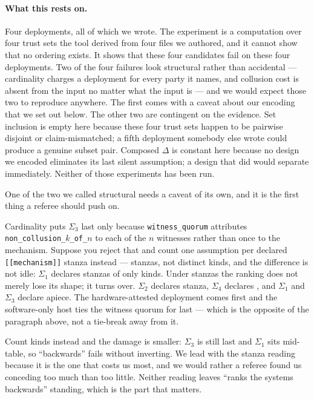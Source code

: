 \documentclass[11pt]{article}
\newcommand{\ub}{\_\allowbreak}
\begin{document}
\paragraph{What this rests on.} Four deployments, all of which we wrote.
The experiment is a computation over four trust sets the tool derived from
four files we authored, and it cannot show that no ordering exists. It shows
that these four candidates fail on these four deployments. Two of the four
failures look structural rather than accidental --- cardinality charges a
deployment for every party it names, and collusion cost is absent from the
input no matter what the input is --- and
we would expect those two to reproduce anywhere. The first comes with a
caveat about our encoding that we set out below. The other two are contingent
on the evidence. Set inclusion is empty here because these four trust sets
happen to be pairwise disjoint or claim-mismatched; a fifth deployment
somebody else wrote could produce a genuine subset pair. Composed $\Delta$ is
constant here because no design we encoded eliminates its last silent
assumption; a design that did would separate immediately. Neither of those
experiments has been run.

One of the two we called structural needs a caveat of its own, and it is the
first thing a referee should push on.

Cardinality puts $\Sigma_3$ last only because \texttt{witness\ub quorum}
attributes \texttt{non\ub collusion\ub $k$\ub of\ub $n$} to each of the $n$
witnesses rather than once to the mechanism. Suppose you reject that and
count one assumption per declared \texttt{[[mechanism]]} stanza instead ---
stanzas, not distinct kinds, and the difference is not idle: $\Sigma_1$
declares \SigmaOneMechanisms{} stanzas of only \SigmaOneMechanismKinds{}
kinds. Under stanzas the ranking does not merely lose its shape; it turns
over. $\Sigma_2$ declares \SigmaTwoMechanisms{} stanza, $\Sigma_4$ declares
\SigmaFourMechanisms{}, and $\Sigma_1$ and $\Sigma_3$ declare
\SigmaOneMechanisms{} apiece. The hardware-attested deployment comes first
and the software-only host ties the witness quorum for last --- which is the
opposite of the paragraph above, not a tie-break away from it.

Count kinds instead and the damage is smaller: $\Sigma_3$ is still last and
$\Sigma_1$ sits mid-table, so ``backwards'' fails without inverting. We lead
with the stanza reading because it is the one that costs us most, and we
would rather a referee found us conceding too much than too little. Neither
reading leaves ``ranks the systems backwards'' standing, which is the part
that matters.
\end{document}
